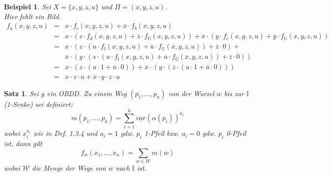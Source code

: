 \documentclass[ngerman]{scrartcl}
\theoremstyle{custom}
\newtheorem{mex}[mdef]{Beispiel}
\newtheorem{ms}[mdef]{Satz}
\newcommand{\0}{\mathbf{0}}
\newcommand{\1}{\mathbf{L}}
\begin{document}
\begin{mex}
Sei $X=\{x,y,z,u\}$ und $\Pi=(x,y,z,u)$. \\
Hier fehlt ein Bild.\\
\begin{eqnarray*}
f_a(x,y,z,u) &=& x \cdot f_c(x,y,z,u) + \overline{x} \cdot
f_b(x,y,z,u) \\
&= & x \cdot (z \cdot f_d(x,y,z,u) + \overline{z} \cdot f_{\mathds{O}}(x,y,z,u))
+ \overline{x} \cdot (y \cdot f_c(x,y,z,u) + \overline{y} \cdot
f_{\mathds{O}}(x,y,z,u))\\
&=& x \cdot (z \cdot (u \cdot f_{\mathds{I}}(x,y,z,u) + \overline{u} \cdot
f_{\mathds{O}}(x,y,z,u)) + \overline{z} \cdot 0) + \\ && \overline{x} \cdot
(y \cdot (z \cdot (u \cdot f_{\mathds{I}}(x,y,z,u) + \overline{u}
\cdot f_{\mathds{O}}(x,y,z,u)) + \overline{z} \cdot 0)) \\
&=& x \cdot (z \cdot (u \cdot 1 + \overline{u} \cdot 0)) +
\overline{x} \cdot (y \cdot (z \cdot (u \cdot 1 + \overline{u} \cdot
0)))\\
&=& x \cdot z \cdot u + \overline{x} \cdot y \cdot z \cdot u 
\end{eqnarray*}
\end{mex}

\begin{ms}
Sei $g$ ein OBDD. Zu einem Weg $(p_1,\dots,p_n)$ von der Wurzel $w$
bis zur $\mathds{I}$ (1-Senke) sei definiert:
\begin{equation*}
m(p_1,\dots,p_k) = \sum_{i=1}^{k}
\underline{var}(\alpha(p_i))^{a_i}
\end{equation*}
wobei $x_i^{a_i}$ wie in Def. 1.3.4 und $a_i=1$ gdw. $p_i$ 1-Pfeil bzw. $a_i=0$ gdw. $p_i$
0-Pfeil ist, dann gilt 
\begin{equation*} f_w(x_1,\dots,x_n) = \sum_{w \in \mathcal{W}}
m(w)
\end{equation*}
wobei $\mathcal{W}$ die Menge der Wege von $w$ nach
$\mathds{I}$ ist.
\end{ms}
\end{document}
